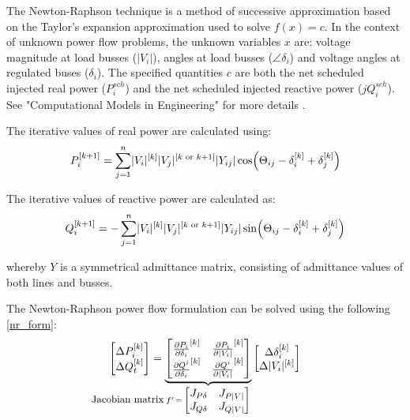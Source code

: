 \documentclass[a4paper,10pt]{report}
\begin{document}
The Newton-Raphson technique is a method of successive approximation based on the Taylor's expansion approximation used to solve $f(x)=c$. In the context of unknown power flow problems, the unknown variables $x$ are: voltage magnitude at load busses ($\lvert V_i\rvert$), angles at load busses ($\angle\delta_i$) and voltage angles at regulated buses ($\delta_i$). The specified quantities $c$ are both the net scheduled injected real power ($P_i^{sch}$) and the net scheduled injected reactive power ($jQ_i^{sch}$). See "Computational Models in Engineering" for more details \cite{Albadi2020}.

The iterative values of real power are calculated using:
\begin{equation}
	P_i^{[k+1]}=\sum^{n}_{j=1}\lvert V_i\rvert^{[k]}\lvert V_j\rvert^{[k \text{ or } k+1]}\lvert Y_{ij}\rvert\cos\Bigl(\Theta_{ij}-\delta_i^{[k]}+\delta_j^{[k]}\Bigr)
\end{equation}

The iterative values of reactive power are calculated as:
\begin{equation}
	Q_i^{[k+1]}=-\sum^{n}_{j=1}\lvert V_i\rvert^{[k]}\lvert V_j\rvert^{[k \text{ or } k+1]}\lvert Y_{ij}\rvert\sin\Bigl(\Theta_{ij}-\delta_i^{[k]}+\delta_j^{[k]}\Bigr)
\end{equation}

whereby $Y$ is a symmetrical admittance matrix, consisting of admittance values of both lines and busses.

The Newton-Raphson power flow formulation can be solved using the following \cref{nr_form}:
\begin{equation}\label{nr_form}
	\begin{bmatrix}
		\Delta P_i^{[k]}\\
		\Delta Q_t^{[k]}
	\end{bmatrix}
	=
	\underbrace{
		\begin{bmatrix}
			\frac{\partial P_i}{\partial \delta_i}^{[k]} & \frac{\partial P_i}{\partial \lvert V_i \rvert}^{[k]}\\
			\frac{\partial Q^i}{\partial \delta_i}^{[k]} & \frac{\partial Q^i}{\partial \lvert V_i \rvert}^{[k]}
		\end{bmatrix}
	}_{\llap{\small Jacobian matrix\:}
		f'\,=\,
		\begin{bmatrix}
			J_{P\delta} & J_{P\lvert V\rvert}\\
			J_{Q\delta} & J_{Q\lvert V\rvert}
		\end{bmatrix}
	}
	\begin{bmatrix}
		\Delta\delta_i^{[k]}\\
		\Delta\lvert V_i \rvert^{[k]}
	\end{bmatrix}
\end{equation}
\end{document}
